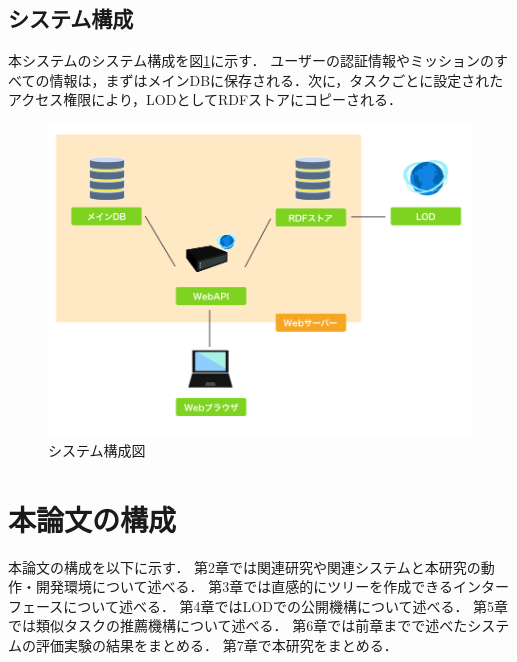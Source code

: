 \subsection{システム構成}
本システムのシステム構成を図\ref{img:system_architecture}に示す．
ユーザーの認証情報やミッションのすべての情報は，まずはメインDBに保存される．次に，タスクごとに設定されたアクセス権限により，LODとしてRDFストアにコピーされる．
\begin{figure}[t]
	\begin{center}
		\includegraphics[width=0.9\linewidth]{assets/img/system_architecture.png}
		\caption{システム構成図}
		\label{img:system_architecture}
	\end{center}
\end{figure}

\section{本論文の構成}
本論文の構成を以下に示す．
第2章では関連研究や関連システムと本研究の動作・開発環境について述べる．
第3章では直感的にツリーを作成できるインターフェースについて述べる．
第4章ではLODでの公開機構について述べる．
第5章では類似タスクの推薦機構について述べる．
第6章では前章までで述べたシステムの評価実験の結果をまとめる．
第7章で本研究をまとめる．
